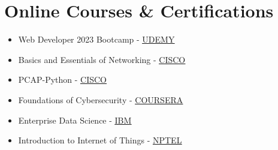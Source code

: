 \documentclass[a4paper,12pt]{article}
\begin{document}
\section{Online Courses \& Certifications}
{\begin{itemize}[label=\textbullet]
      \item Web Developer 2023 Bootcamp - \underline{\color{blue}\href{https://drive.google.com/file/d/1v2aDBI_oHGfecwRPIbP4QpjEPpKJfl-8/view?usp=drive_link}{UDEMY}}
      \item Basics and Essentials of Networking - \underline{\color{blue}\href{https://drive.google.com/file/d/1NoDVvWcOLDmxr3mvDn7hGmif1SnMqiTB/view?usp=drive_link}{CISCO}}
      \item PCAP-Python - \underline{\color{blue}\href{https://drive.google.com/file/d/11Wmtq0AhBBpOnp3DB7pjsBluE8Qsh9Yz/view?usp=drive_link}{CISCO}}
      \item Foundations of Cybersecurity - \underline{\color{blue}\href{https://drive.google.com/file/d/1_36YLfgVpm8cbNkrpViiCoYu5saAOHiB/view?usp=drive_link}{COURSERA}}
      \item Enterprise Data Science - \underline{\color{blue}\href{https://drive.google.com/file/d/1t-xrsltajYGhzCY9CBbgM9gadMbxiPDL/view?usp=drive_link}{IBM}}
      \item Introduction to Internet of Things - \underline{\color{blue}\href{https://drive.google.com/file/d/18I8pP-aYDCg1jbKLHWYvlaSoq-YC3hCC/view?usp=drive_link}{NPTEL}}
  \end{itemize}} 
\end{document}
